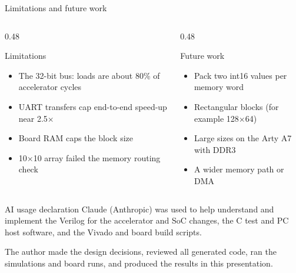 \documentclass[aspectratio=169,11pt]{beamer}
\begin{document}
\begin{frame}{Limitations and future work}
  \begin{columns}[T,onlytextwidth]
    \begin{column}{0.48\textwidth}
      \begin{block}{Limitations}
        \begin{itemize}
          \item The 32-bit bus: loads are about 80\% of accelerator cycles
          \item UART transfers cap end-to-end speed-up near 2.5$\times$
          \item Board RAM caps the block size
          \item 10$\times$10 array failed the memory routing check
        \end{itemize}
      \end{block}
    \end{column}
    \begin{column}{0.48\textwidth}
      \begin{block}{Future work}
        \begin{itemize}
          \item Pack two int16 values per memory word
          \item Rectangular blocks (for example 128$\times$64)
          \item Large sizes on the Arty A7 with DDR3
          \item A wider memory path or DMA
        \end{itemize}
      \end{block}
    \end{column}
  \end{columns}
\end{frame}

\begin{frame}{AI usage declaration}
  Claude (Anthropic) was used to help understand and implement the Verilog for the accelerator and SoC changes, the C test and PC host software, and the Vivado and board build scripts.
  \vspace{3mm}

  The author made the design decisions, reviewed all generated code, ran the simulations and board runs, and produced the results in this presentation.
\end{frame}
\end{document}
